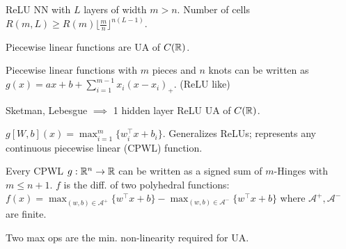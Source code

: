 \begin{theorem}[Montufar]
    ReLU NN with \(L\) layers of width \(m > n\). Number of cells \(R(m, L) \geq R(m) \lfloor \frac m n \rfloor^{n(L-1)}\). 
\end{theorem}

\begin{theorem}[Shektman]
    Piecewise linear functions are UA of \(C(\mathbb{R})\).
\end{theorem}

\begin{theorem}[Lebesgue]
    Piecewise linear functions with \(m\) pieces and \(n\) knots can be written as \(g(x) = ax + b + \sum_{i=1}^{m-1} x_i(x - x_i)_+\). (ReLU like)
\end{theorem}

\begin{theorem}[UAT]
    Sketman, Lebesgue \(\implies\) 1 hidden layer ReLU UA of \(C(\mathbb{R})\).
\end{theorem}

\begin{definition}
    $g[W,b](x) = \max_{i=1}^m \{w_i^\top x + b_i\}$. 
    Generalizes ReLUs; represents any continuous piecewise linear ({\color{H2}CPWL}) function.
\end{definition}

\begin{theorem}[Wang]
    Every {\color{H2}CPWL} $g: \mathbb{R}^n \to \mathbb{R}$ can be written as a signed sum of $m$-Hinges with $m \leq n+1$. $f$ is the diff. of two polyhedral functions:
    $f(x) = \max_{(w,b) \in \mathcal{A}^+} \{w^\top x + b\} - \max_{(w,b) \in \mathcal{A}^-} \{w^\top x + b\}$
    where $\mathcal{A}^+, \mathcal{A}^-$ are finite.
\end{theorem}

\begin{corollary}
    Two max ops are the min. non-linearity required for UA.
\end{corollary}

